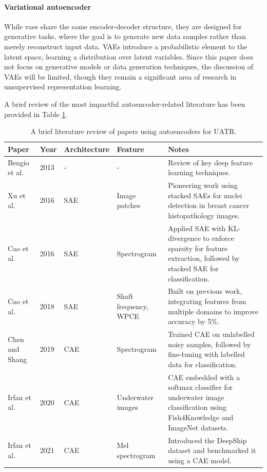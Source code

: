 \paragraph{Variational autoencoder} While \acrshort{vae}s share the same encoder-decoder structure, they are designed for generative tasks, where the goal is to generate new data samples rather than merely reconstruct input data. VAEs introduce a probabilistic element to the latent space, learning a distribution over latent variables. Since this paper does not focus on generative models or data generation techniques, the discussion of VAEs will be limited, though they remain a significant area of research in unsupervised representation learning.

A brief review of the most impactful autoencoder-related literature has been provided in Table \ref{tab:ae-review}.

\begin{table}
\centering
\begin{tabular}{lllp{4cm}p{11cm}}
\toprule
\textbf{Paper} & \textbf{Year} & \textbf{Architecture} & \textbf{Feature} & \textbf{Notes} \\ \midrule
Bengio et al. \cite{bengio_representation_2013} & 2013 & - & - & Review of key deep feature learning techniques. \\
Xu et al. \cite{xu_stacked_2016} & 2016 & SAE & Image patches & Pioneering work using stacked SAEs for nuclei detection in breast cancer histopathology images. \\
Cao et al. \cite{cao_deep_2016} & 2016 & SAE & Spectrogram & Applied SAE with KL-divergence to enforce sparsity for feature extraction, followed by stacked SAE for classification. \\
Cao et al. \cite{cao_convolutional_2019} & 2018 & SAE & Shaft frequency, WPCE & Built on previous work, integrating features from multiple domains to improve accuracy by 5\%. \\
Chen and Shang \cite{chenUnderwaterTargetRecognition2019} & 2019 & CAE & Spectrogram & Trained CAE on unlabelled noisy samples, followed by fine-tuning with labelled data for classification. \\
Irfan et al. \cite{irfan_novel_2021} & 2020 & CAE & Underwater images & CAE embedded with a softmax classifier for underwater image classification using Fish4Knowledge and ImageNet datasets. \\
Irfan et al. \cite{irfan_deepship_2021} & 2021 & CAE & Mel spectrogram & Introduced the DeepShip dataset and benchmarked it using a CAE model. \\ \bottomrule
\end{tabular}
\caption{A brief literature review of papers using autoencoders for UATR.}
\label{tab:ae-review}
\end{table}

